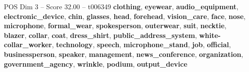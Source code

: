 \begin{textsample}{POS Dim 3 – Score 32.00 – t006349}  \label{ex:f3_pos_003}
\textbf{clothing}, \textbf{eyewear}, \textbf{audio\_equipment}, \textbf{electronic\_device}, \textbf{chin}, \textbf{glasses}, \textbf{head}, \textbf{forehead}, \textbf{vision\_care}, \textbf{face}, \textbf{nose}, \textbf{microphone}, \textbf{formal\_wear}, \textbf{spokesperson}, \textbf{outerwear}, \textbf{suit}, \textbf{necktie}, \textbf{blazer}, \textbf{collar}, \textbf{coat}, \textbf{dress\_shirt}, \textbf{public\_address\_system}, \textbf{white-collar\_worker}, \textbf{technology}, \textbf{speech}, \textbf{microphone\_stand}, \textbf{job}, \textbf{official}, \textbf{businessperson}, \textbf{speaker}, \textbf{management}, \textbf{news\_conference}, \textbf{organization}, \textbf{government\_agency}, \textbf{wrinkle}, \textbf{podium}, \textbf{output\_device}

\end{textsample}
